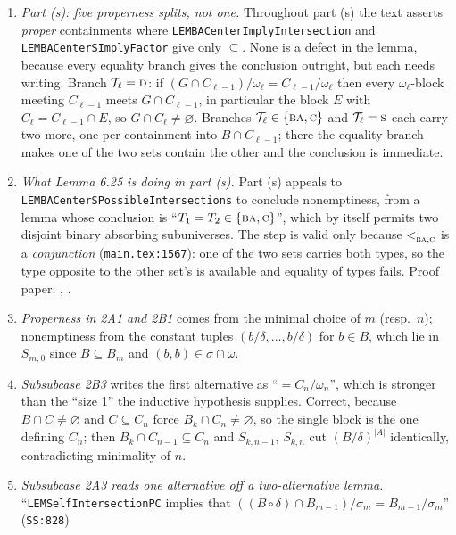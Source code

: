 \begin{enumerate}\tightlist
\item \emph{Part (s): five properness splits, not one.} Throughout part (s) the
  text asserts \emph{proper} containments where
  \texttt{LEMBACenterImplyIntersection} and \texttt{LEMBACenterSImplyFactor}
  give only $\subseteq$. None is a defect in the lemma, because every equality
  branch gives the conclusion outright, but each needs writing. Branch
  $\mathcal T_{\ell}=\textup{\textsc{d}}$: if
  $(G\cap C_{\ell-1})/\omega_{\ell}=C_{\ell-1}/\omega_{\ell}$ then every
  $\omega_{\ell}$-block meeting $C_{\ell-1}$ meets $G\cap C_{\ell-1}$, in
  particular the block $E$ with $C_{\ell}=C_{\ell-1}\cap E$, so
  $G\cap C_{\ell}\neq\varnothing$. Branches
  $\mathcal T_{\ell}\in\{\textup{\textsc{ba}},\textup{\textsc{c}}\}$ and $\mathcal T_{\ell}=\textup{\textsc{s}}$ each carry two
  more, one per containment into $B\cap C_{\ell-1}$; there the equality branch
  makes one of the two sets contain the other and the conclusion is immediate.
\item \emph{What Lemma 6.25 is doing in part (s).} Part (s) appeals to
  \texttt{LEMBACenterS\brk Possible\brk Intersections} to conclude
  nonemptiness, from a lemma whose conclusion is ``$T_{1}=T_{2}\in\{\textup{\textsc{ba}},\textup{\textsc{c}}\}$'', which by itself
  permits two disjoint binary absorbing subuniverses. The step is valid only
  because $<_{\textup{\textsc{ba}},\textup{\textsc{c}}}^{}$ is a \emph{conjunction} (\texttt{main.tex:1567}):
  one of the two sets carries both types, so the type opposite to the other
  set's is available and equality of types fails. Proof paper:
  , .
\item \emph{Properness in 2A1 and 2B1} comes from the minimal choice of $m$
  (resp.\ $n$); nonemptiness from the constant tuples
  $(b/\delta,\dots,b/\delta)$ for $b\in B$, which lie in $S_{m,0}$ since
  $B\subseteq B_{m}$ and $(b,b)\in\sigma\cap\omega$.
\item \emph{Subsubcase 2B3} writes the first alternative as
  ``$=C_{n}/\omega_{n}$'', which is stronger than the ``size 1'' the inductive
  hypothesis supplies. Correct, because $B\cap C\neq\varnothing$ and
  $C\subseteq C_{n}$ force $B_{k}\cap C_{n}\neq\varnothing$, so the single
  block is the one defining $C_{n}$; then $B_{k}\cap C_{n-1}\subseteq C_{n}$
  and $S_{k,n-1}$, $S_{k,n}$ cut $(B/\delta)^{|A|}$ identically, contradicting
  minimality of $n$.
\item \emph{Subsubcase 2A3 reads one alternative off a two-alternative lemma.}
  ``\texttt{LEMSelf\brk IntersectionPC} implies that
  $((B\circ\delta)\cap B_{m-1})/\sigma_{m}=B_{m-1}/\sigma_{m}$'' (\texttt{SS:828})

\end{enumerate}
